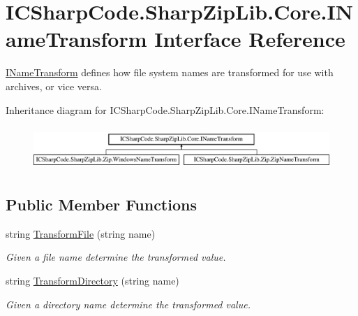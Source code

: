 \hypertarget{interface_i_c_sharp_code_1_1_sharp_zip_lib_1_1_core_1_1_i_name_transform}{}\section{I\+C\+Sharp\+Code.\+Sharp\+Zip\+Lib.\+Core.\+I\+Name\+Transform Interface Reference}
\label{interface_i_c_sharp_code_1_1_sharp_zip_lib_1_1_core_1_1_i_name_transform}


\hyperlink{interface_i_c_sharp_code_1_1_sharp_zip_lib_1_1_core_1_1_i_name_transform}{I\+Name\+Transform} defines how file system names are transformed for use with archives, or vice versa.  


Inheritance diagram for I\+C\+Sharp\+Code.\+Sharp\+Zip\+Lib.\+Core.\+I\+Name\+Transform\+:\begin{figure}[H]
\begin{center}
\leavevmode
\includegraphics[height=1.666667cm]{interface_i_c_sharp_code_1_1_sharp_zip_lib_1_1_core_1_1_i_name_transform}
\end{center}
\end{figure}
\subsection*{Public Member Functions}
\begin{DoxyCompactItemize}
\item 
string \hyperlink{interface_i_c_sharp_code_1_1_sharp_zip_lib_1_1_core_1_1_i_name_transform_ae6d37bd063a1b8844bca4a7ccbd6ec7a}{Transform\+File} (string name)
\begin{DoxyCompactList}\small\item\em Given a file name determine the transformed value. \end{DoxyCompactList}\item 
string \hyperlink{interface_i_c_sharp_code_1_1_sharp_zip_lib_1_1_core_1_1_i_name_transform_a8052780160a8d458799e014aa8308c78}{Transform\+Directory} (string name)
\begin{DoxyCompactList}\small\item\em Given a directory name determine the transformed value. \end{DoxyCompactList}\end{DoxyCompactItemize}


